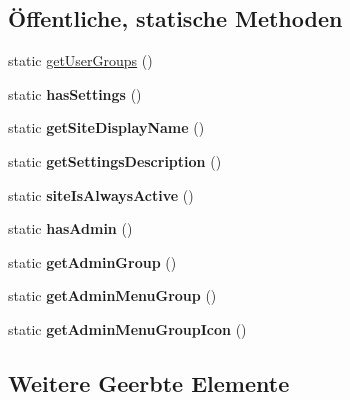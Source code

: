 \subsection*{Öffentliche, statische Methoden}
\begin{DoxyCompactItemize}
\item 
static \mbox{\hyperlink{classadministrationcron_a3b2d408b7433316b3dce0faa774c62c0}{get\+User\+Groups}} ()
\item 
\mbox{\label{classadministrationcron_a6adaae9ae778efdea9ae487e7d1f8bfc}} 
static {\bfseries has\+Settings} ()
\item 
\mbox{\label{classadministrationcron_ae83ddb8656b0dbf7da0820b57d9790cd}} 
static {\bfseries get\+Site\+Display\+Name} ()
\item 
\mbox{\label{classadministrationcron_a76b570d27ffd01303468b56a92789a97}} 
static {\bfseries get\+Settings\+Description} ()
\item 
\mbox{\label{classadministrationcron_a9ca71fae86a804c17a1eff698dce742c}} 
static {\bfseries site\+Is\+Always\+Active} ()
\item 
\mbox{\label{classadministrationcron_aafd49c7758a49cc7b33a342f4d51bca3}} 
static {\bfseries has\+Admin} ()
\item 
\mbox{\label{classadministrationcron_aa5ea6273c1f8a52058d502e1a111552f}} 
static {\bfseries get\+Admin\+Group} ()
\item 
\mbox{\label{classadministrationcron_ac7285d3578594c7c96981bbe6fdb036a}} 
static {\bfseries get\+Admin\+Menu\+Group} ()
\item 
\mbox{\label{classadministrationcron_a3a6a32111b6301568ffd7bcb58734f20}} 
static {\bfseries get\+Admin\+Menu\+Group\+Icon} ()
\end{DoxyCompactItemize}
\subsection*{Weitere Geerbte Elemente}


